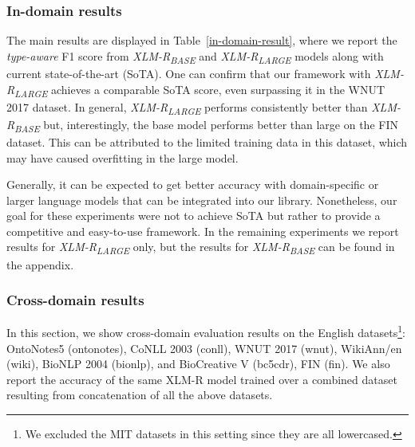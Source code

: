 \documentclass[11pt,a4paper]{article}
\begin{document}
\subsubsection{In-domain results}
\label{indomainresults}

The main results are displayed in Table~\ref{in-domain-result}, where we report the \textit{type-aware} F1 score from {\it XLM-R\textsubscript{BASE}} and {\it XLM-R\textsubscript{LARGE}} models along with current state-of-the-art (SoTA).
One can confirm that our framework with {\it XLM-R\textsubscript{LARGE}} achieves a comparable SoTA score, even surpassing it in the WNUT 2017 dataset. In general, {\it XLM-R\textsubscript{LARGE}} performs consistently better than {\it XLM-R\textsubscript{BASE}} but, interestingly, the base model performs better than large on the FIN dataset. This can be attributed to the limited training data in this dataset, which may have caused overfitting in the large model.

Generally, it can be expected to get better accuracy with domain-specific or larger language models that can be integrated into our library. Nonetheless, our goal for these experiments were not to achieve SoTA but rather to provide a competitive and easy-to-use framework. In the remaining experiments we report results for {\it XLM-R\textsubscript{LARGE}} only, but the results for {\it XLM-R\textsubscript{BASE}} can be found in the appendix.

\subsubsection{Cross-domain results}
\label{crossdomainresults}
In this section, we show cross-domain evaluation results on the English datasets\footnote{We excluded the MIT datasets in this setting since they are all lowercased.}: OntoNotes5 (ontonotes), CoNLL 2003 (conll), WNUT 2017 (wnut), WikiAnn/en (wiki), BioNLP 2004 (bionlp), and BioCreative V (bc5cdr), FIN (fin). 
We also report the accuracy of the same XLM-R model trained over a combined dataset resulting from concatenation of all the above datasets. 
\end{document}
